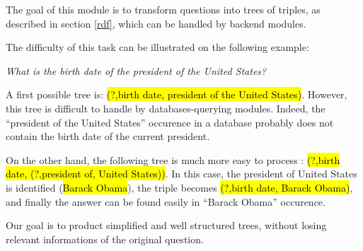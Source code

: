 
The goal of this module is to transform questions into trees of triples, as described in section \ref{rdf}, which can be handled by backend modules.

The difficulty of this task can be illustrated on the following example: 
\begin{center}
 \textit{What is the birth date of the president of the United States?}
\end{center}

A first possible tree is: \hl{(?,birth date, president of the United States)}. However, this tree is difficult to handle by databases-querying modules. Indeed, the ``president of the United States'' occurence in a database probably does not contain the birth date of the current president. 

On the other hand, the following tree is much more easy to process : \hl{(?,birth date, (?,president of, United States))}. In this case, the president of United States is identified (\hl{Barack Obama}), the triple becomes \hl{(?,birth date, Barack Obama)}, and finally the answer can be found easily in ``Barack Obama'' occurence.

Our goal is to product simplified and well structured trees, without losing relevant informations of the original question.